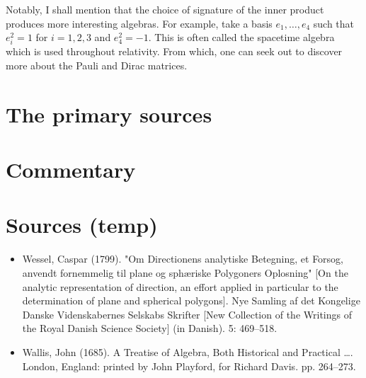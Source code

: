 \documentclass[12pt]{article}
\begin{document}
Notably, I shall mention that the choice of signature of the inner product produces more interesting algebras. For example, take a basis $e_1,\dots, e_4$ such that $e_i^2=1$ for $i=1,2,3$ and $e_4^2=-1$. This is often called the spacetime algebra which is used throughout relativity. From which, one can seek out to discover more about the Pauli and Dirac matrices.


\section{The primary sources}

\section{Commentary}


\section{Sources (temp)}

\begin{itemize}
    \item  Wessel, Caspar (1799). "Om Directionens analytiske Betegning, et Forsog, anvendt fornemmelig til plane og sphæriske Polygoners Oplosning" [On the analytic representation of direction, an effort applied in particular to the determination of plane and spherical polygons]. Nye Samling af det Kongelige Danske Videnskabernes Selskabs Skrifter [New Collection of the Writings of the Royal Danish Science Society] (in Danish). 5: 469–518.
    \item Wallis, John (1685). A Treatise of Algebra, Both Historical and Practical …. London, England: printed by John Playford, for Richard Davis. pp. 264–273.
\end{itemize}




\end{document}
